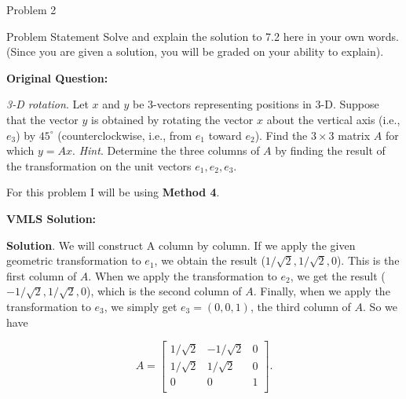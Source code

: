 \begin{problem}{Problem 2}
    \begin{statement}{Problem Statement}
        Solve and explain the solution to 7.2  here in your own words. (Since you are given a solution, you will be graded on your ability to explain). \vspace*{1em}

        \noindent \textbf{Original Question:} \vspace*{1em}

        \textit{3-D rotation}. Let $x$ and $y$ be 3-vectors representing positions in 3-D. Suppose that the vector $y$ is obtained by rotating the vector $x$ about the vertical axis (i.e., $e_{3}$) 
        by $45^{\circ}$ (counterclockwise, i.e., from $e_{1}$ toward $e_{2}$). Find the $3 \times 3$ matrix $A$ for which $y = Ax$. \textit{Hint}. Determine the three columns of $A$ by finding the 
        result of the transformation on the unit vectors $e_{1}, e_{2}, e_{3}$.
    \end{statement}

    \begin{Highlight}[Solution]
        For this problem I will be using \textbf{Method 4}. \vspace*{1em}

        \noindent \textbf{VMLS Solution:} \vspace*{1em}
        
        \textbf{Solution}. We will construct A column by column. If we apply the given geometric transformation to $e_{1}$, we obtain the result ($1 / \sqrt{2}, 1 / \sqrt{2}, 0$). This is the first column of 
        $A$. When we apply the transformation to $e_{2}$, we get the result ($-1 / \sqrt{2}, 1 / \sqrt{2}, 0$), which is the second column of $A$. Finally, when we apply the transformation to $e_{3}$, 
        we simply get $e_{3} = (0,0,1)$, the third column of $A$. So we have

        \begin{equation*}
            A = 
            \begin{bmatrix}
                1 / \sqrt{2} & -1 / \sqrt{2} & 0 \\
                1 / \sqrt{2} & 1 / \sqrt{2} & 0 \\
                0 & 0 & 1 \\
            \end{bmatrix}.
        \end{equation*}


\end{Highlight}
\end{problem}
